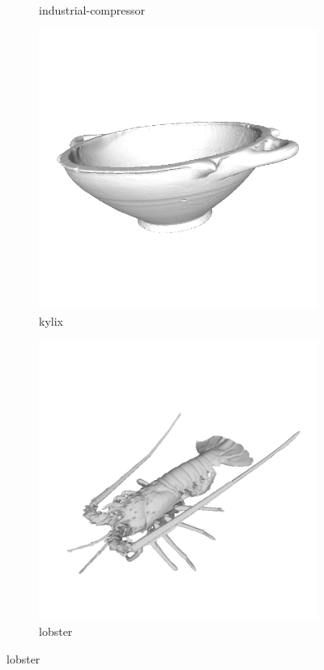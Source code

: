 \begin{figure}
\begin{subfigure}[b]{0.23\linewidth}
		\caption{industrial-compressor}
	\end{subfigure}
	\begin{subfigure}[b]{0.23\linewidth}
		\includegraphics[width=\linewidth]{./Figures/train-dataset/26.kylix.png}
		\caption{kylix}
	\end{subfigure}
	\begin{subfigure}[b]{0.23\linewidth}
		\includegraphics[width=\linewidth]{./Figures/train-dataset/27.lobster.png}
		\caption{lobster}
	\end{subfigure}
	

\end{figure}
